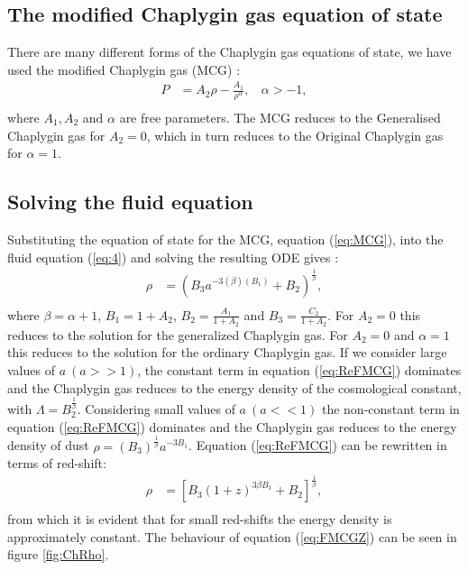 \documentclass[a0,portrait]{a0poster}
\newcommand{\brac}[1]{\left(#1\right)}
\newcommand{\bracc}[1]{\left[#1\right]}
\begin{document}
\begin{multicols}{2}
\color{SaddleBrown} %
\section*{The modified Chaplygin gas equation of state}
There are many different forms of the Chaplygin gas equations of state, we have used the modified Chaplygin gas (MCG) \citep{kahya2015universe}:
\begin{equation}\label{eq:MCG}
\begin{split}
P &=A_{2}\rho -\frac{A_{1}}{\rho^{\alpha}},\ \ \ \ \alpha>-1,         \\
\end{split}
\end{equation}
where $A_{1},A_{2}$ and $\alpha$ are free parameters. The MCG reduces to the Generalised Chaplygin gas for $A_{2}=0$, which in turn reduces to the Original Chaplygin gas for $\alpha=1$.
\subsection*{Solving the fluid equation}
Substituting the equation of state for the MCG, equation (\ref{eq:MCG}), into the fluid equation (\ref{eq:4}) and solving the resulting ODE gives :
\begin{equation}\label{eq:ReFMCG}
\begin{split}
\rho&=\brac{B_{3}a^{-3\brac{\beta}\brac{B_{1}}}+B_{2}}^{\frac{1}{\beta}},\\
\end{split}
\end{equation}
where $\beta=\alpha+1$, $B_{1}=1+A_{2}$, $B_{2}=\frac{A_{1}}{1+A_{2}}$ and $B_{3}=\frac{C_{2}}{1+A_{2}}$.
For $A_{2}=0$ this reduces to the solution for the generalized Chaplygin gas. For $A_{2}=0$ and $\alpha=1$ this reduces to the solution for the ordinary Chaplygin gas.
If we consider large values of $a\ \brac{a>>1}$, the constant term in equation (\ref{eq:ReFMCG}) dominates and the Chaplygin gas reduces to the energy density of the cosmological constant, with $\Lambda=B_{2}^{\frac{1}{\beta}}$. Considering small values of $a\ \brac{a<<1}$ the non-constant term in equation (\ref{eq:ReFMCG}) dominates and the Chaplygin gas reduces to the energy density of dust $\rho=\brac{B_{3}}^{\frac{1}{\beta}}a^{-3B_{1}}$. Equation (\ref{eq:ReFMCG}) can be rewritten in terms of red-shift:
\begin{equation}\label{eq:FMCGZ}
\begin{split}
\rho  &= \bracc{B_{3}\brac{1+z}^{3\beta B_{1}}+B_{2}}^{\frac{1}{\beta}},         \\
\end{split}
\end{equation}
from which it is evident that for small red-shifts the energy density is approximately constant. The behaviour of equation (\ref{eq:FMCGZ}) can be seen in figure \ref{fig:ChRho}.
	

\end{multicols}
\end{document}
